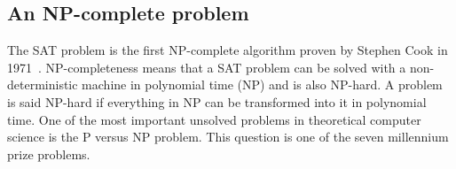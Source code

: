%

\subsection{An NP-complete problem}
The SAT problem is the first NP-complete algorithm proven by Stephen Cook in 1971~\cite{cook1971complexity}.
NP-completeness means that a SAT problem can be solved with a non-deterministic machine in polynomial time (NP) and is also NP-hard. A problem is said NP-hard if everything in NP can be transformed into it in polynomial time. 
One of the most important unsolved problems in theoretical computer science is the P versus NP problem.
This question is one of the seven millennium prize problems.


